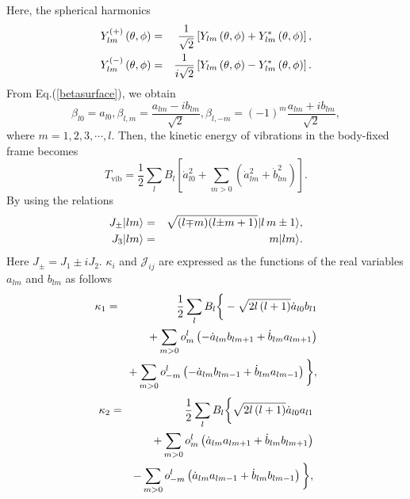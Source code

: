 \documentclass[twocolumn,prc,showpacs,preprintnumbers,superscriptaddress,floatfix]{revtex4}
\begin{document}
Here, the spherical harmonics
\begin{eqnarray}
Y_{lm}^{\left( +\right) }\left( \theta ,\phi \right)  &=&\frac{1}{\sqrt{2}}%
\left[ Y_{lm}\left( \theta ,\phi \right) +Y_{lm}^{\ast }\left( \theta ,\phi
\right) \right] ,  \notag \\
Y_{lm}^{\left( -\right) }\left( \theta ,\phi \right)  &=&\frac{1}{i\sqrt{2}}%
\left[ Y_{lm}\left( \theta ,\phi \right) -Y_{lm}^{\ast }\left( \theta ,\phi
\right) \right] .  \label{Ylmpm}
\end{eqnarray}%
From Eq.(\ref{betasurface}), we obtain
\begin{equation}
\beta _{l0}=a_{l0},\beta _{l,m}=\frac{a_{lm}-ib_{lm}}{\sqrt{2}},\beta
_{l,-m}=\left( -1\right) ^{m}\frac{a_{lm}+ib_{lm}}{\sqrt{2}},
\end{equation}%
where $m=1,2,3,\cdots ,l$. Then, the kinetic energy of vibrations in the
body-fixed frame becomes
\begin{equation}
T_{\text{vib}}=\frac{1}{2}\sum_{l}B_{l}\left[ \dot{a}_{l0}^{2}+\sum_{m>0}%
\left( \dot{a}_{lm}^{2}+\dot{b}_{lm}^{2}\right) \right] .  \label{Tvibab}
\end{equation}%
By using the relations
\begin{eqnarray}
J_{\pm }|lm\rangle  &=&\sqrt{(l{\mp }m)(l{\pm }m+1)}|l\,m\pm 1\rangle ,
\notag \\
J_{3}|lm\rangle  &=&m|lm\rangle .  \label{Jangular}
\end{eqnarray}%
Here $J_{\pm }=J_{1}{\pm }iJ_{2}$. $\kappa _{i}$ and $\mathscr{J}_{ij}$ are
expressed as the functions of the real variables $a_{lm}$ and $b_{lm}$ as
follows
\begin{eqnarray}
\kappa _{1} &=&\frac{1}{2}\sum_{l}B_{l}\bigg\{-\sqrt{2l\left( l+1\right) }%
\dot{a}_{l0}b_{l1}  \notag \\
&&+\sum_{m>0}o_{m}^{l}\left( -\dot{a}_{lm}b_{lm+1}+\dot{b}%
_{lm}a_{lm+1}\right)   \notag \\
&&+\sum_{m>0}o_{-m}^{l}\left( -\dot{a}_{lm}b_{lm-1}+\dot{b}%
_{lm}a_{lm-1}\right) \bigg\},  \label{kappa1}
\end{eqnarray}%
\begin{eqnarray}
\kappa _{2} &=&\frac{1}{2}\sum_{l}B_{l}\bigg\{\sqrt{2l\left( l+1\right) }%
\dot{a}_{l0}a_{l1}  \notag \\
&&+\sum_{m>0}o_{m}^{l}\left( \dot{a}_{lm}a_{lm+1}+\dot{b}_{lm}b_{lm+1}%
\right)   \notag \\
&&-\sum_{m>0}o_{-m}^{l}\left( \dot{a}_{lm}a_{lm-1}+\dot{b}%
_{lm}b_{lm-1}\right) \bigg\},  \label{kappa2}
\end{eqnarray}%
\end{document}
